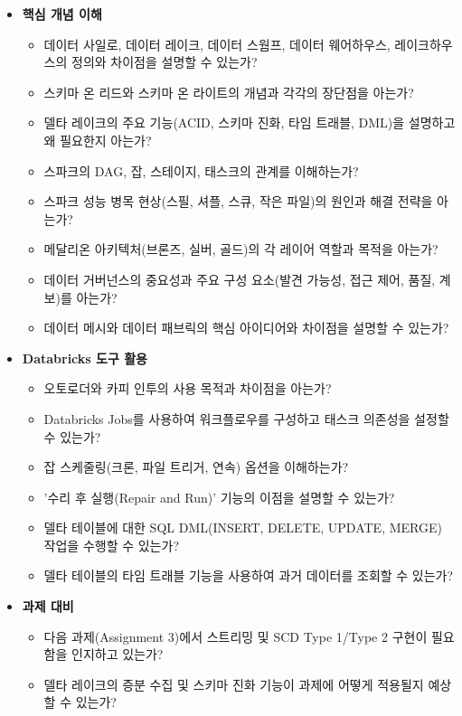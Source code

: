 \documentclass[11pt,a4paper]{article}
\theoremstyle{definition}
\begin{document}
\begin{tcolorbox}[title=\textbf{CSCI103 Lecture 5 학습 체크리스트}, colback=yellow!5!white, colframe=yellow!75!black, sharp corners, boxrule=0.8pt]
\begin{itemize}
    \item \textbf{핵심 개념 이해}
    \begin{itemize}
        \item [ ] 데이터 사일로, 데이터 레이크, 데이터 스웜프, 데이터 웨어하우스, 레이크하우스의 정의와 차이점을 설명할 수 있는가?
        \item [ ] 스키마 온 리드와 스키마 온 라이트의 개념과 각각의 장단점을 아는가?
        \item [ ] 델타 레이크의 주요 기능(ACID, 스키마 진화, 타임 트래블, DML)을 설명하고 왜 필요한지 아는가?
        \item [ ] 스파크의 DAG, 잡, 스테이지, 태스크의 관계를 이해하는가?
        \item [ ] 스파크 성능 병목 현상(스필, 셔플, 스큐, 작은 파일)의 원인과 해결 전략을 아는가?
        \item [ ] 메달리온 아키텍처(브론즈, 실버, 골드)의 각 레이어 역할과 목적을 아는가?
        \item [ ] 데이터 거버넌스의 중요성과 주요 구성 요소(발견 가능성, 접근 제어, 품질, 계보)를 아는가?
        \item [ ] 데이터 메시와 데이터 패브릭의 핵심 아이디어와 차이점을 설명할 수 있는가?
    \end{itemize}
    \item \textbf{Databricks 도구 활용}
    \begin{itemize}
        \item [ ] 오토로더와 카피 인투의 사용 목적과 차이점을 아는가?
        \item [ ] Databricks Jobs를 사용하여 워크플로우를 구성하고 태스크 의존성을 설정할 수 있는가?
        \item [ ] 잡 스케줄링(크론, 파일 트리거, 연속) 옵션을 이해하는가?
        \item [ ] '수리 후 실행(Repair and Run)' 기능의 이점을 설명할 수 있는가?
        \item [ ] 델타 테이블에 대한 SQL DML(INSERT, DELETE, UPDATE, MERGE) 작업을 수행할 수 있는가?
        \item [ ] 델타 테이블의 타임 트래블 기능을 사용하여 과거 데이터를 조회할 수 있는가?
    \end{itemize}
    \item \textbf{과제 대비}
    \begin{itemize}
        \item [ ] 다음 과제(Assignment 3)에서 스트리밍 및 SCD Type 1/Type 2 구현이 필요함을 인지하고 있는가?
        \item [ ] 델타 레이크의 증분 수집 및 스키마 진화 기능이 과제에 어떻게 적용될지 예상할 수 있는가?
    \end{itemize}
\end{itemize}
\end{tcolorbox}
\end{document}
